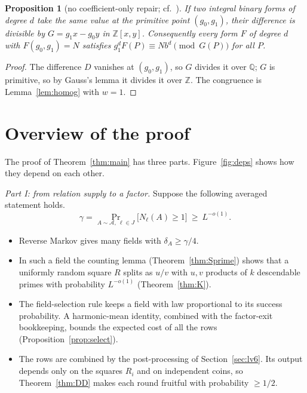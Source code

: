 \documentclass[11pt]{amsart}
\newtheorem{proposition}[theorem]{Proposition}
\theoremstyle{definition}
\newcommand{\Z}{\mathbb{Z}}
\newcommand{\Q}{\mathbb{Q}}
\newcommand{\cA}{\mathcal{A}}
\newcommand{\Prob}{\Pr}
\begin{document}
\begin{proposition}[no coefficient-only repair; cf.\ {\cite{lv2018}}]\label{prop:gauss}
If two integral binary forms of degree $d$ take the same value at the primitive point $(g_0,g_1)$,
their difference is divisible by $G=g_1x-g_0y$ in $\Z[x,y]$. Consequently every form $F$ of degree $d$ with
$F(g_0,g_1)=N$ satisfies $g_1^dF(P)\equiv Nb^d\pmod{G(P)}$ for all $P$.
\end{proposition}

\begin{proof}
The difference $D$ vanishes at $(g_0,g_1)$, so $G$ divides it over $\Q$; $G$ is primitive, so by Gauss's lemma it divides
it over $\Z$. The congruence is Lemma~\ref{lem:homog} with $w=1$.
\end{proof}

\section{Overview of the proof}\label{sec:overview}

The proof of Theorem~\ref{thm:main} has three parts. Figure~\ref{fig:deps} shows how they depend on each other.

\emph{Part I: from relation supply to a factor.} Suppose the following averaged statement holds.
\begin{equation}\label{eq:Dk}
\gamma=\Prob_{A\sim\cA,\ \ell\in J}\bigl[N_\ell(A)\ge1\bigr]\ \ge\ L^{-o(1)}.\tag{$\mathrm D_k$}
\end{equation}
\begin{itemize}
\item Reverse Markov gives many fields with $\delta_A\ge\gamma/4$.
\item In such a field the counting lemma (Theorem~\ref{thm:Sprime}) shows that a uniformly random square $R$ splits as $u/v$ with
  $u,v$ products of $k$ descendable primes with probability $L^{-o(1)}$ (Theorem~\ref{thm:K}).
\item The field-selection rule keeps a field with law proportional to its success probability. A harmonic-mean identity, combined with the
  factor-exit bookkeeping, bounds the expected cost of all the rows (Proposition~\ref{prop:select}).
\item The rows are combined by the post-processing of Section~\ref{sec:lv6}. Its output depends only on the squares $R_i$ and on
  independent coins, so Theorem~\ref{thm:DD} makes each round fruitful with probability $\ge1/2$.
\end{itemize}
\end{document}
